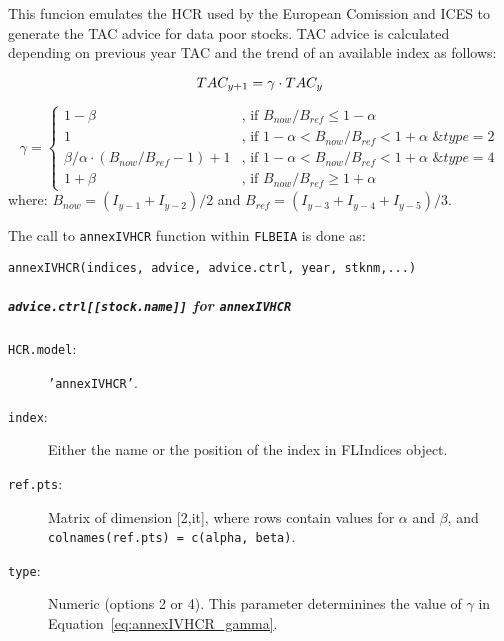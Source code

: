   This funcion emulates the HCR used by the European Comission and ICES to generate the TAC advice for data poor stocks.
  TAC advice is calculated depending on previous year TAC and the trend of an available index as follows:

  \begin{equation}
  	TAC_{y+1} =  \gamma \cdot TAC_y \\
  \end{equation}

  \begin{equation}
  	\gamma =
  	\begin{cases}
				1 - \beta & \text{, if } B_{now}/B_{ref} \leq 1 - \alpha \\
				1         & \text{, if } 1 - \alpha < B_{now}/B_{ref} < 1 + \alpha
				            \text{ \& }  type = 2\\
				\beta/\alpha \cdot (B_{now}/B_{ref}-1) + 1
				          & \text{, if } 1 - \alpha < B_{now}/B_{ref} < 1 + \alpha
				            \text{ \& }  type = 4\\
				1 + \beta & \text{, if } B_{now}/B_{ref} \geq 1 + \alpha
  	\end{cases}
  	\label{eq:annexIVHCR_gamma}
  \end{equation}
  \noindent where: $B_{now} = (I_{y-1} + I_{y-2}) / 2$ and  $B_{ref} = (I_{y-3} + I_{y-4} + I_{y-5}) / 3$.

  The call to \texttt{annexIVHCR} function within \texttt{FLBEIA} is done as:
	
	\begin{center}
		\texttt{annexIVHCR(indices, advice, advice.ctrl, year, stknm,...)} 
	\end{center}

	\subparagraph{\texttt{advice.ctrl[[stock.name]]} for \texttt{annexIVHCR}}

	\begin{description}
	    \item[\texttt{HCR.model}:] \texttt{'annexIVHCR'}.
		  \item[\texttt{index}:] Either the name or the position of the index in FLIndices object.
		  \item[\texttt{ref.pts}:] Matrix of dimension [2,it], 
		    where rows contain values for $\alpha$ and $\beta$, 
		    and \texttt{colnames(ref.pts) = c(alpha, beta)}.
		  \item[\texttt{type}:] Numeric (options 2 or 4). This parameter determinines the value of $\gamma$ in Equation~\ref{eq:annexIVHCR_gamma}.
	\end{description}


